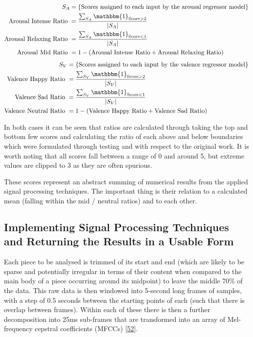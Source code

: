\documentclass[12pt,]{article}
\begin{document}
\[\begin{aligned}
S_A &= \{\text{Scores assigned to each input by the arousal regressor model}\} \\
\text{Arousal Intense Ratio } &= \frac{\sum_{S_A} \mathbbm{1}_{\text{Score}> 2}}{|S_A|} \\
\text{Arousal Relaxing Ratio } &= \frac{\sum_{S_A} \mathbbm{1}_{\text{Score}< 1}}{|S_A|} \\
\text{Arousal Mid Ratio } &= 1 - (\text{Arousal Intense Ratio} + \text{Arousal Relaxing Ratio})
\end{aligned}\] \[\begin{aligned}
S_V &= \{\text{Scores assigned to each input by the valence regressor model}\} \\
\text{Valence Happy Ratio } &= \frac{\sum_{S_V} \mathbbm{1}_{\text{Score}> 2}}{|S_V|} \\
\text{Valence Sad Ratio } &= \frac{\sum_{S_V} \mathbbm{1}_{\text{Score}< 1}}{|S_V|} \\
\text{Valence Neutral Ratio } &= 1 - (\text{Valence Happy Ratio} + \text{Valence Sad Ratio}) \\
\end{aligned}\]

In both cases it can be seen that ratios are calculated through taking
the top and bottom few scores and calculating the ratio of each above
and below boundaries which were formulated through testing and with
respect to the original work. It is worth noting that all scores fall
between a range of 0 and around 5, but extreme values are clipped to 3
as they are often spurious.

These scores represent an abstract summing of numerical results from the
applied signal processing techniques. The important thing is their
relation to a calculated mean (falling within the mid / neutral ratios)
and to each other.

\hypertarget{implementing-signal-processing-techniques-and-returning-the-results-in-a-usable-form}{%
\subsection{Implementing Signal Processing Techniques and Returning the
Results in a Usable
Form}\label{implementing-signal-processing-techniques-and-returning-the-results-in-a-usable-form}}

Each piece to be analysed is trimmed of its start and end (which are
likely to be sparse and potentially irregular in terms of their content
when compared to the main body of a piece occurring around its midpoint)
to leave the middle 70\% of the data. This raw data is then windowed
into 5-second long frames of samples, with a step of 0.5 seconds between
the starting points of each (such that there is overlap between frames).
Within each of these there is then a further decomposition into 25ms
sub-frames that are transformed into an array of Mel-frequency cepstral
coefficients (MFCCs) {[}\protect\hyperlink{ref-logan2000mel}{52}{]}.
\end{document}

